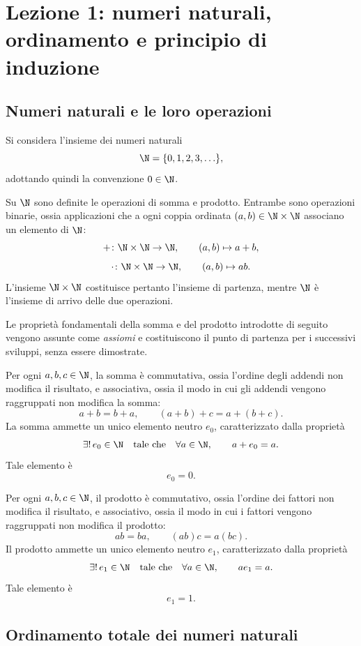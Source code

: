 \chapter[Lezione 1 --- 29 settembre 2026]{Lezione 1: numeri naturali, ordinamento e principio di induzione}
\label{chap:lezione-01}

\section{Numeri naturali e le loro operazioni}
\label{sec:lez01-numeri-naturali}

Si considera l'insieme dei numeri naturali
\[
  \N=\{0,1,2,3,\ldots\},
\]
adottando quindi la convenzione \(0\in\N\).

Su \(\N\) sono definite le operazioni di somma e prodotto. Entrambe sono
operazioni binarie, ossia applicazioni che a ogni coppia ordinata
\((a,b)\in\N\times\N\) associano un elemento di \(\N\):
\[
  +\colon\N\times\N\to\N,
  \qquad
  (a,b)\mapsto a+b,
\]
\[
  \cdot\colon\N\times\N\to\N,
  \qquad
  (a,b)\mapsto ab.
\]
L'insieme \(\N\times\N\) costituisce pertanto l'insieme di partenza,
mentre \(\N\) è l'insieme di arrivo delle due operazioni.

Le proprietà fondamentali della somma e del prodotto introdotte di seguito
vengono assunte come \emph{assiomi} e costituiscono il punto di
partenza per i successivi sviluppi, senza essere dimostrate.

Per ogni \(a,b,c\in\N\), la somma è commutativa, ossia l'ordine degli
addendi non modifica il risultato, e associativa, ossia il modo in cui
gli addendi vengono raggruppati non modifica la somma:
\[
  a+b=b+a,
  \qquad
  (a+b)+c=a+(b+c).
\]
La somma ammette un unico elemento neutro \(e_0\), caratterizzato
dalla proprietà
\[
  \exists!\,e_0\in\N
  \quad\text{tale che}\quad
  \forall a\in\N,\qquad a+e_0=a.
\]
Tale elemento è
\[
  e_0=0.
\]

Per ogni \(a,b,c\in\N\), il prodotto è commutativo, ossia l'ordine dei
fattori non modifica il risultato, e associativo, ossia il modo in cui i
fattori vengono raggruppati non modifica il prodotto:
\[
  ab=ba,
  \qquad
  (ab)c=a(bc).
\]
Il prodotto ammette un unico elemento neutro \(e_1\), caratterizzato
dalla proprietà
\[
  \exists!\,e_1\in\N
  \quad\text{tale che}\quad
  \forall a\in\N,\qquad ae_1=a.
\]
Tale elemento è
\[
  e_1=1.
\]

\clearpage

\section{Ordinamento totale dei numeri naturali}
\label{sec:lez01-ordine-naturali}

